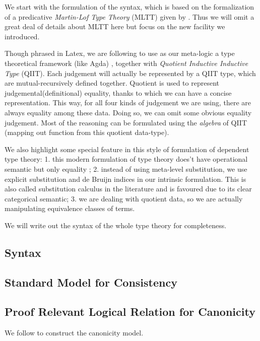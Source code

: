 
We start with the formulation of the syntax, which is based on the formalization of a predicative \textit{Martin-Lof Type Theory} (MLTT) given by \citep{coquand2018canonicity}. Thus we will omit a great deal of details about MLTT here but focus on the new facility we introduced. 

Though phrased in Latex, we are following \citep{kaposi2017type} to use as our meta-logic a type theoretical framework (like Agda) , 
together with \textit{Quotient Inductive Inductive Type} (QIIT). Each judgement will actually be represented by a QIIT type, which are mutual-recursively defined together. Quotient is used to represent judgemental(definitional) equality, thanks to which we can have a concise representation. This way, for all four kinds of judgement we are using, there are always equality among these data. Doing so, we can omit some obvious equality judgement. Most of the reasoning can be formulated using the \textit{algebra} of QIIT (mapping out function from this quotient data-type). 

We also highlight some special feature in this style of formulation of dependent type theory: 1. this modern formulation of type theory does't have operational semantic but only equality 
;
2. instead of using meta-level substitution, we use explicit substitution and de Bruijn indices in our intrinsic formulation. This is also called substitution calculus in the literature and is favoured due to its clear categorical semantic; 
3. we are dealing with quotient data, so we are actually manipulating equivalence classes of terms. 

We will write out the syntax of the whole type theory for completeness.


\newcommand{\denotes}[1]{{\llbracket {#1} \rrbracket}}
\newcommand{\denotesS}[1]{{{\llbracket {#1} \rrbracket}_S}}
\newcommand{\goodCtx}[2]{{ {#1} \ \vdash }}
\newcommand{\goodType}[3]{{ {#1} \vdash {#2} }}
\newcommand{\goodTerm}[3]{{ {#1} \vdash {#2} : {#3} }}
\newcommand{\goodSub}[3]{{ {#1} \vdash {#2} : {#3} }}
\newcommand{\goodSig}[3]{{ {#1} \vdash {#2} \ \  Sig^{#3} }}
\newcommand{\goodWSig}[3]{{ {#1} \vdash {#2} \ \ WSig^{#3} }}
\newcommand{\goodSeal}[4]{{ {#1} \vdash {#2} : {#3} \  |\  {#4} }}
\newcommand{\goodInh}[4]{{ {#1} \vdash {#2} : {#3} \twoheadrightarrow {#4}}}
\newcommand{\nat}{\mathbf{N}}

\newcommand{\cU}{{\mathcal{U}}}
\newcommand{\cB}{{\mathbb{B}}}
\newcommand{\cL}{{\mathcal{L}}}
\newcommand{\bW}{{\mathbb{W}}}



\subsection{Syntax}





\subsection{Standard Model for Consistency}




\subsection{Proof Relevant Logical Relation for Canonicity}
We follow \citep{sterling2019algebraic,coquand2018canonicity} to construct the canonicity model. 
